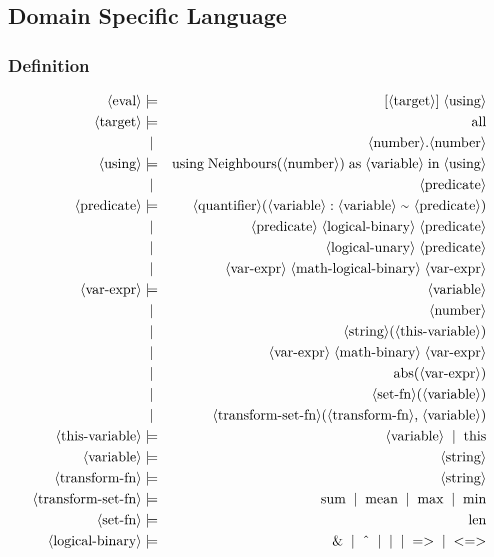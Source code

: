 \subsection{Domain Specific Language}

\subsubsection{Definition}
\begin{eqnarray*}
	\pn{eval} & \pp & [ \pn{target} ] \ww \pn{using} \\
	\pn{target} & \pp & \sm{all} \\
	~ & \oo & \pn{number}\sm{.}\pn{number} \\
%
	\pn{using} & \pp & \sm{using} \ww \sm{Neighbours}\sm{(}\pn{number}\sm{)} \ww \sm{as} \ww \pn{variable} \ww \sm{in} \ww \pn{using} \\
	~ & \oo & \pn{predicate} \\
%
	\pn{predicate} & \pp & \pn{quantifier}\sm{(}\pn{variable} \ww \sm{:} \ww \pn{variable} \ww \sm{\mytilde} \pn{predicate} \sm{)}\\
	~ & \oo &  \pn{predicate} \ww \pn{logical-binary} \ww \pn{predicate} \\
	~ & \oo &  \pn{logical-unary} \ww \pn{predicate} \\
	~ & \oo &  \pn{var-expr} \ww \pn{math-logical-binary} \ww \pn{var-expr} \\
%
	\pn{var-expr} & \pp & \pn{variable} \\
	~ & \oo & \pn{number} \\
	~ & \oo & \pn{string}\sm{(}\pn{this-variable}\sm{)} \\
	~ & \oo & \pn{var-expr} \ww \pn{math-binary} \ww \pn{var-expr} \\
	~ & \oo & \sm{abs}\sm{(}\pn{var-expr}\sm{)} \\
	~ & \oo & \pn{set-fn}\sm{(}\pn{variable}\sm{)} \\
	~ & \oo & \pn{transform-set-fn}\sm{(}\pn{transform-fn}\sm{,} \ww \pn{variable}\sm{)} \\
%
	\pn{this-variable} & \pp & \pn{variable} \oo \sm{this} \\
	\pn{variable} & \pp & \pn{string} \\
%
	\pn{transform-fn} & \pp & \pn{string} \\
	\pn{transform-set-fn} & \pp & \sm{sum} \oo  \sm{mean} \oo \sm{max} \oo \sm{min} \\
	\pn{set-fn} & \pp & \sm{len} \\
%
	\pn{logical-binary} & \pp & \sm{\&} \oo \sm{$\text{\^{}}$} \oo \sm{\textbar} \oo \sm{=\textgreater} \oo \sm{\textless=\textgreater} \\

\end{eqnarray*}
